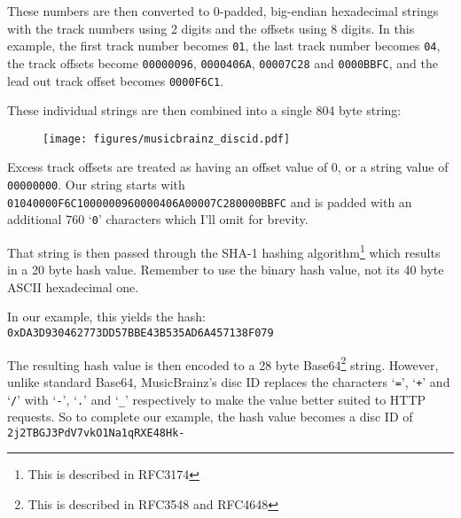 These numbers are then converted to 0-padded, big-endian hexadecimal strings
with the track numbers using 2 digits and the offsets using 8 digits.
In this example, the first track number becomes \texttt{01},
the last track number becomes \texttt{04},
the track offsets become \texttt{00000096}, \texttt{0000406A},
\texttt{00007C28} and \texttt{0000BBFC},
and the lead out track offset becomes \texttt{0000F6C1}.

These individual strings are then combined into a single 804 byte string:
\begin{figure}[h]
\texttt{[image: figures/musicbrainz\_discid.pdf]}
\end{figure}

Excess track offsets are treated as having an offset value of 0,
or a string value of \texttt{00000000}.
Our string starts with \texttt{01040000F6C1000000960000406A00007C280000BBFC}
and is padded with an additional 760 `\texttt{0}' characters
which I'll omit for brevity.

That string is then passed through the SHA-1 hashing algorithm\footnote{This is described in RFC3174}
which results in a 20 byte hash value.
Remember to use the binary hash value, not its 40 byte ASCII hexadecimal one.

In our example, this yields the hash:
\texttt{0xDA3D930462773DD57BBE43B535AD6A457138F079}

The resulting hash value is then encoded to a 28 byte Base64\footnote{This is described in RFC3548 and RFC4648} string.
However, unlike standard Base64, MusicBrainz's disc ID replaces the
characters `\texttt{=}', `\texttt{+}' and `\texttt{/}' with `\texttt{-}', `\texttt{.}' and `\texttt{\_}' respectively to
make the value better suited to HTTP requests.
So to complete our example, the hash value becomes a disc ID of
\texttt{2j2TBGJ3PdV7vkO1Na1qRXE48Hk-}
